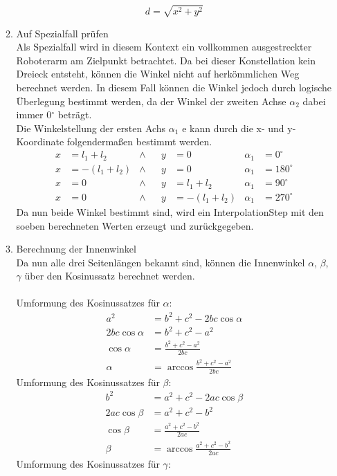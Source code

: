 \begin{itemize}
\begin{enumerate}
\begin{equation*}
d = \sqrt{x^2 + y^2}
\end{equation*}
\item Auf Spezialfall prüfen\\
Als Spezialfall wird in diesem Kontext ein vollkommen ausgestreckter Roboterarm am Zielpunkt betrachtet. Da bei dieser Konstellation kein Dreieck entsteht, können die Winkel nicht auf herkömmlichen Weg berechnet werden. In diesem Fall können die Winkel jedoch durch logische Überlegung bestimmt werden, da der Winkel der zweiten Achse $\alpha_2$ dabei immer 0$^\circ$ beträgt.\\
Die Winkelstellung der ersten Achs $\alpha_1$ e kann durch die x- und y-Koordinate folgendermaßen bestimmt werden.
\begin{align*}
x & = l_1+l_2 &\wedge && y & = 0 & \alpha_1 & = 0^\circ \\
x & = -(l_1+l_2) &\wedge && y & = 0 & \alpha_1 & = 180^\circ \\ 
x & = 0 &\wedge && y & = l_1+l_2 & \alpha_1 & = 90^\circ \\
x & = 0 &\wedge && y & = -(l_1+l_2) & \alpha_1 & = 270^\circ
\end{align*}
Da nun beide Winkel bestimmt sind, wird ein InterpolationStep mit den soeben berechneten Werten erzeugt und zurückgegeben.
\item Berechnung der Innenwinkel\\
Da nun alle drei Seitenlängen bekannt sind, können die Innenwinkel $\alpha$, $\beta$, $\gamma$ über den Kosinussatz berechnet werden.\\
\\
Umformung des Kosinussatzes für $\alpha$:
\begin{align*}
a^2 & = b^2 + c^2 - 2bc \cos \alpha \\
2bc \cos \alpha & = b^2 + c^2 - a^2 \\
\cos \alpha & = \frac{b^2 + c^2 - a^2}{2bc} \\
\alpha & = \arccos \frac{b^2 + c^2 - a^2}{2bc}
\end{align*}
Umformung des Kosinussatzes für $\beta$:
\begin{align*}
b^2 & = a^2 + c^2 - 2ac \cos \beta \\
2ac \cos \beta & = a^2 + c^2 - b^2 \\
\cos \beta & = \frac{a^2 + c^2 - b^2}{2ac} \\
\beta & = \arccos \frac{a^2 + c^2 - b^2}{2ac}
\end{align*}
Umformung des Kosinussatzes für $\gamma$:

\end{enumerate}
\end{itemize}
